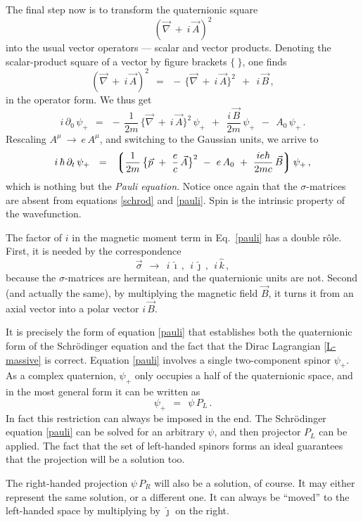 \documentclass[epsfig,12pt]{article}
\newcommand{\p}{\partial}
\newcommand{\lgr}{\left\lgroup}
\newcommand{\rgr}{\right\rgroup}
\newcommand{\ii}{\hat\imath}
\newcommand{\jj}{\hat\jmath}
\newcommand{\kk}{\hat k}
\begin{document}
	The final step now is to transform the quaternionic square
\[
	(\vec\nabla ~+~ i\,\vec A)^2
\]
	into the usual vector operators --- scalar and vector products.
	Denoting the scalar-product square of a vector by figure brackets $ \{~ \} $,
	one finds
\[
	(\vec\nabla ~+~ i\,\vec A)^2	~~=~~	-\, \big\{\vec\nabla ~+~ i\,\vec A\big\}^2  ~~+~~  i\,\vec B\,,
\]
	in the operator form.
	We thus get
\begin{equation}
\label{schrod}
	i\,\p_0\,\psi_+		~~=~~
		-\,\frac 1 {2m}\, \big\{ \vec\nabla ~+~ i\,\vec A\big \}^2\,\psi_+
		~~+~~  \frac{i\,\vec B}{2m}\, \psi_+  ~~-~~  A_0\,\psi_+\,.
\end{equation}
	Rescaling $ A^\mu ~\to~ e\,A^\mu $, and switching to the Gaussian units,
	we arrive to
\begin{equation}
\label{pauli}
	i\,\hbar\,\p_t\,\psi_+	~~=~~
		\lgr
			\frac 1 {2m}\, \big\{ \vec p ~+~ \frac e c\,\vec A \big\}^2
			~-~  e\,A_0
			~+~  \frac{i e \hbar}{2 m c}\,\vec B
		\rgr \psi_+\,,
\end{equation}
	which is nothing but the \emph{Pauli equation}.
	Notice once again that the $ \sigma $-matrices are absent from equations \eqref{schrod} and \eqref{pauli}.
	Spin is the intrinsic property of the wavefunction.

	The factor of $ i $ in the magnetic moment term in Eq.~\eqref{pauli} has a double r\^ole.
	First, it is needed by the correspondence
\[
	\vec \sigma	~~\to~~		i\,\ii\,,~~ i\,\jj\,,~~ i\,\kk\,,
\]
	because the $ \sigma $-matrices are hermitean, and the quaternionic units are not.
	Second (and actually the same), by multiplying the magnetic field $ \vec B $,
	it turns it from an axial vector into a polar vector $ i\,\vec B $.

	It is precisely the form of equation \eqref{pauli} that establishes both the quaternionic form
	of the Schr\"odinger equation
	and the fact that the Dirac Lagrangian \eqref{L-massive} is correct.
	Equation \eqref{pauli} involves a single two-component spinor $ \psi_+ $.
	As a complex quaternion, $ \psi_+ $ only occupies a half of the quaternionic space,
	and in the most	general form it can be written as
\[
	\psi_+		~~=~~	\psi\,P_L\,.
\]
	In fact this restriction can always be imposed in the end.
	The Schr\"odinger equation \eqref{pauli} can be solved for an arbitrary $ \psi $,
	and then projector $ P_L $ can be applied.
	The fact that the set of left-handed spinors forms an ideal guarantees that
	the projection will be a solution too.

	The right-handed projection $ \psi\,P_R $ will also be a solution, of course.
	It may either represent the same solution, or a different one.
	It can always be ``moved'' to the left-handed space by multiplying by $ \jj $
	on the right.
\end{document}
